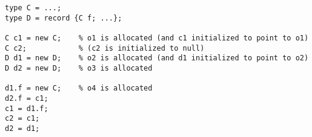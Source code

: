 \documentclass[11pt]{exam}
\begin{document}
\begin{questions}
\begin{lstlisting}
type C = ...;
type D = record {C f; ...};

C c1 = new C;    % o1 is allocated (and c1 initialized to point to o1)
C c2;            % (c2 is initialized to null)
D d1 = new D;    % o2 is allocated (and d1 initialized to point to o2)
D d2 = new D;    % o3 is allocated

d1.f = new C;    % o4 is allocated
d2.f = c1;
c1 = d1.f;
c2 = c1;
d2 = d1;
\end{lstlisting}

	\begin{framed}

	\end{framed}

\end{questions}
\end{document}
